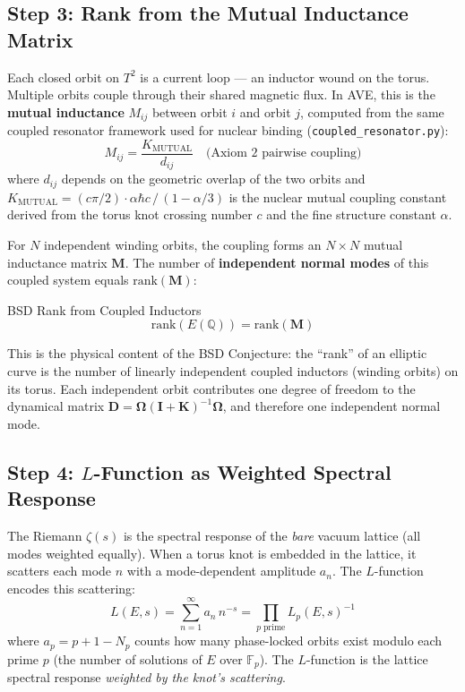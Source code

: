\subsection{Step 3: Rank from the Mutual Inductance Matrix}

Each closed orbit on $T^2$ is a current loop --- an inductor wound on the torus. Multiple orbits couple through their shared magnetic flux. In AVE, this is the \textbf{mutual inductance} $M_{ij}$ between orbit $i$ and orbit $j$, computed from the same coupled resonator framework used for nuclear binding (\texttt{coupled\_resonator.py}):
\begin{equation}
    M_{ij} = \frac{K_\mathrm{MUTUAL}}{d_{ij}} \quad \text{(Axiom~2 pairwise coupling)}
\end{equation}
where $d_{ij}$ depends on the geometric overlap of the two orbits and $K_\mathrm{MUTUAL} = (c\pi/2) \cdot \alpha\hbar c \,/\, (1 - \alpha/3)$ is the nuclear mutual coupling constant derived from the torus knot crossing number $c$ and the fine structure constant $\alpha$.

For $N$ independent winding orbits, the coupling forms an $N \times N$ mutual inductance matrix $\mathbf{M}$. The number of \textbf{independent normal modes} of this coupled system equals $\mathrm{rank}(\mathbf{M})$:
\begin{resultbox}{BSD Rank from Coupled Inductors}
\begin{equation}
    \mathrm{rank}(E(\mathbb{Q})) = \mathrm{rank}(\mathbf{M})
\end{equation}
\end{resultbox}
This is the physical content of the BSD Conjecture: the ``rank'' of an elliptic curve is the number of linearly independent coupled inductors (winding orbits) on its torus. Each independent orbit contributes one degree of freedom to the dynamical matrix $\mathbf{D} = \boldsymbol{\Omega} (\mathbf{I} + \mathbf{K})^{-1} \boldsymbol{\Omega}$, and therefore one independent normal mode.

\subsection{Step 4: $L$-Function as Weighted Spectral Response}

The Riemann $\zeta(s)$ is the spectral response of the \textit{bare} vacuum lattice (all modes weighted equally). When a torus knot is embedded in the lattice, it scatters each mode $n$ with a mode-dependent amplitude $a_n$. The $L$-function encodes this scattering:
\begin{equation}
    L(E, s) = \sum_{n=1}^{\infty} a_n \, n^{-s} = \prod_{p\;\mathrm{prime}} L_p(E, s)^{-1}
\end{equation}
where $a_p = p + 1 - N_p$ counts how many phase-locked orbits exist modulo each prime $p$ (the number of solutions of $E$ over $\mathbb{F}_p$). The $L$-function is the lattice spectral response \textit{weighted by the knot's scattering}.

